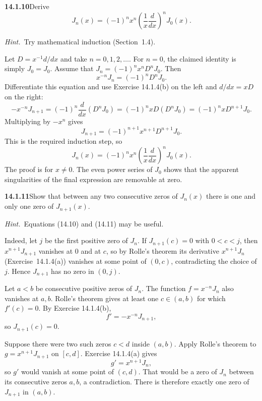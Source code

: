 \par\bigskip
\noindent\textbf{14.1.10}\quad Derive
\[
J_{n}(x)=(-1)^{n}x^{n}\left(\frac{1}{x}\frac{d}{dx}\right)^{n}J_{0}(x).
\]
\par\emph{Hint.}~Try mathematical induction (Section~1.4).
\par{}
\solution
Let $D=x^{-1}d/dx$ and take $n=0,1,2,\ldots$.
For $n=0$, the claimed identity is simply $J_0=J_0$.
Assume that $J_n=(-1)^nx^nD^nJ_0$. Then
\[
x^{-n}J_n=(-1)^nD^nJ_0.
\]
Differentiate this equation and use Exercise 14.1.4(b) on the left
and $d/dx=xD$ on the right:
\[
-x^{-n}J_{n+1}=(-1)^n\frac d{dx}(D^nJ_0)
=(-1)^nxD(D^nJ_0)=(-1)^nxD^{n+1}J_0.
\]
Multiplying by $-x^n$ gives
\[
J_{n+1}=(-1)^{n+1}x^{n+1}D^{n+1}J_0.
\]
This is the required induction step, so
\[
\boxed{J_n(x)=(-1)^nx^n\left(\frac1x\frac d{dx}\right)^nJ_0(x)}.
\]
The proof is for $x\ne0$. The even power series of $J_0$ shows that
the apparent singularities of the final expression are removable at zero.

\par\bigskip
\noindent\textbf{14.1.11}\quad Show that between any two consecutive
zeros of $J_{n}(x)$ there is one and only one zero of $J_{n+1}(x)$.
\par\emph{Hint.}~Equations (14.10) and (14.11) may be useful.
\par{}
\solution
{}
Indeed, let $j$ be the first positive zero of $J_n$. If $J_{n+1}(c)=0$
with $0<c<j$, then $x^{n+1}J_{n+1}$ vanishes at $0$ and at $c$, so by
Rolle's theorem its derivative $x^{n+1}J_n$ (Exercise~14.1.4(a))
vanishes at some point of $(0,c)$, contradicting the choice of $j$.
Hence $J_{n+1}$ has no zero in $(0,j)$.

Let $a<b$ be consecutive positive zeros of $J_n$. The function
$f=x^{-n}J_n$ also vanishes at $a,b$. Rolle's theorem gives at least
one $c\in(a,b)$ for which $f'(c)=0$. By Exercise 14.1.4(b),
\[
f'=-x^{-n}J_{n+1},
\]
so $J_{n+1}(c)=0$.

Suppose there were two such zeros $c<d$ inside $(a,b)$. Apply Rolle's
theorem to $g=x^{n+1}J_{n+1}$ on $[c,d]$. Exercise 14.1.4(a) gives
\[
g'=x^{n+1}J_n,
\]
so $g'$ would vanish at some point of $(c,d)$. That would be a zero
of $J_n$ between its consecutive zeros $a,b$, a contradiction.
There is therefore exactly one zero of $J_{n+1}$ in $(a,b)$.

